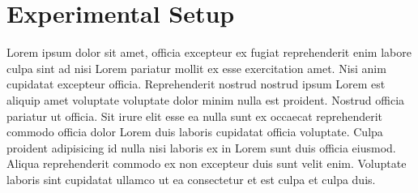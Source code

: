 \chapter{Experimental Setup}
\label{ch:experimental-setup}


Lorem ipsum dolor sit amet, officia excepteur ex fugiat reprehenderit enim
labore culpa sint ad nisi Lorem pariatur mollit ex esse exercitation amet. Nisi
anim cupidatat excepteur officia. Reprehenderit nostrud nostrud ipsum Lorem est
aliquip amet voluptate voluptate dolor minim nulla est proident. Nostrud
officia pariatur ut officia. Sit irure elit esse ea nulla sunt ex occaecat
reprehenderit commodo officia dolor Lorem duis laboris cupidatat officia
voluptate. Culpa proident adipisicing id nulla nisi laboris ex in Lorem sunt
duis officia eiusmod. Aliqua reprehenderit commodo ex non excepteur duis sunt
velit enim. Voluptate laboris sint cupidatat ullamco ut ea consectetur et est
culpa et culpa duis.
